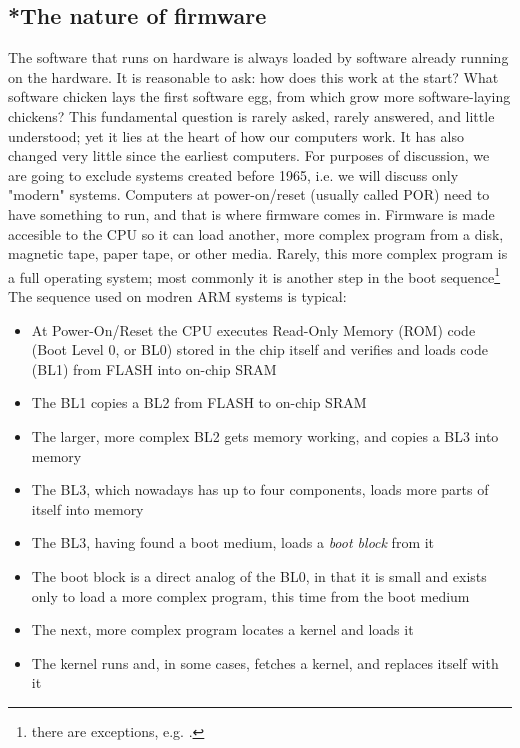 \documentclass[conference]{IEEEtran}
\begin{document}
\subsection{*The nature of firmware}
The software that runs on hardware is always loaded by software already running on the hardware. 
It is reasonable to ask: how does this work at the start? What software chicken lays the first software egg, from which grow more software-laying chickens?
This fundamental question is rarely asked, rarely answered, and little understood; yet it lies at the heart of how our computers work.
It has also changed very little since the earliest computers.
For purposes of discussion, we are going to exclude systems created before 1965, i.e. we will discuss only "modern" systems.
Computers at power-on/reset (usually called POR) need to have something to run, and that is where firmware comes in. Firmware is made accesible to the CPU so it can load another, more complex program from a disk, magnetic tape, paper tape, or other media. Rarely, this more complex program is a full operating system; most commonly it is another step in the boot sequence\footnote{there are exceptions, e.g. \cite{minnich2000linux}.}
The sequence used on modren ARM systems is typical:
\begin{itemize}
    \item At Power-On/Reset the CPU  executes Read-Only Memory (ROM) code (Boot Level 0, or BL0) stored in the chip itself  and verifies and loads code (BL1) from FLASH into on-chip SRAM
    \item The BL1 copies a BL2 from FLASH to on-chip SRAM
    \item The larger, more complex BL2 gets memory working, and copies a BL3 into memory
    \item The BL3, which nowadays has up to four components, loads more parts of itself into memory
    \item The BL3, having found a boot medium, loads a \textit{boot block} from it
    \item The boot block is a direct analog of the BL0, in that it is small and exists only to load a more complex program, this time from the boot medium
    \item The next, more complex program locates a kernel and loads it
    \item The kernel runs and, in some cases, fetches a kernel, and replaces itself with it
\end{itemize}
\end{document}

